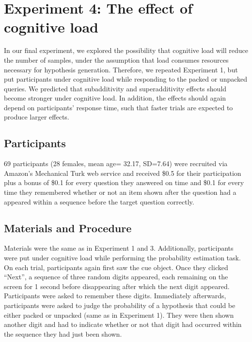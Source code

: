 \section{Experiment 4: The effect of cognitive load}

In our final experiment, we explored the possibility that cognitive load will reduce the number of samples, under the assumption that load consumes resources necessary for hypothesis generation. Therefore, we repeated Experiment 1, but put participants under cognitive load while responding to the packed or unpacked queries. We predicted that subadditivity and superadditivity effects should become stronger under cognitive load. In addition, the effects should again depend on participants' response time, such that faster trials are expected to produce larger effects.

\subsection{Participants}
69 participants (28 females, mean age= 32.17, SD=7.64) were recruited via Amazon's Mechanical Turk web service and received \$0.5 for their participation plus a bonus of \$0.1 for every question they answered on time and \$0.1 for every time they remembered whether or not an item shown after the question had a appeared within a sequence before the target question correctly.

\subsection{Materials and Procedure}
Materials were the same as in Experiment 1 and 3. Additionally, participants were put under cognitive load while performing the probability estimation task. On each trial, participants again first saw the cue object. Once they clicked ``Next'', a sequence of three random digits appeared, each remaining on the screen for 1 second before disappearing after which the next digit appeared. Participants were asked to remember these digits. Immediately afterwards, participants were asked to judge the probability of a hypothesis that could be either packed or unpacked (same as in Experiment 1). They were then shown another digit and had to indicate whether or not that digit had occurred within the sequence they had just been shown.


